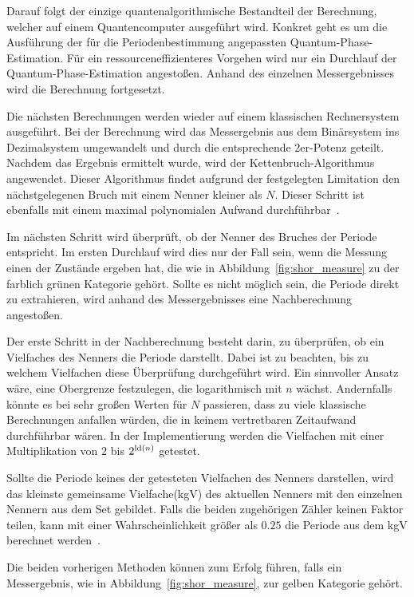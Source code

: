 Darauf folgt der einzige quantenalgorithmische Bestandteil der Berechnung, 
welcher auf einem Quantencomputer ausgeführt wird.
Konkret geht es um die Ausführung der für die Periodenbestimmung angepassten Quantum-Phase-Estimation. 
Für ein ressourceneffizienteres Vorgehen wird nur ein Durchlauf der Quantum-Phase-Estimation angestoßen.
Anhand des einzelnen Messergebnisses wird die Berechnung fortgesetzt.

Die nächsten Berechnungen werden wieder auf einem klassischen Rechnersystem ausgeführt.
Bei der Berechnung wird das Messergebnis aus dem Binärsystem ins Dezimalsystem umgewandelt
und durch die entsprechende 2er-Potenz geteilt.
Nachdem das Ergebnis ermittelt wurde, 
wird der Kettenbruch-Algorithmus angewendet. 
Dieser Algorithmus findet aufgrund der festgelegten Limitation den nächstgelegenen Bruch mit einem Nenner kleiner als \(N\).
Dieser Schritt ist ebenfalls mit einem maximal polynomialen Aufwand durchführbar~\autocite[230]{nielsen_chuang_2010}.

Im nächsten Schritt wird überprüft, ob der Nenner des Bruches der Periode entspricht.
Im ersten Durchlauf wird dies nur der Fall sein, 
wenn die Messung einen der Zustände ergeben hat, 
die wie in Abbildung~\ref{fig:shor_measure} zu der farblich grünen Kategorie gehört.
Sollte es nicht möglich sein, die Periode direkt zu extrahieren, 
wird anhand des Messergebnisses eine Nachberechnung angestoßen.

Der erste Schritt in der Nachberechnung besteht darin, 
zu überprüfen, ob ein Vielfaches des Nenners die Periode darstellt.
Dabei ist zu beachten, bis zu welchem Vielfachen diese Überprüfung durchgeführt wird. 
Ein sinnvoller Ansatz wäre, eine Obergrenze festzulegen, die logarithmisch mit \(n\) wächst.
Andernfalls könnte es bei sehr großen Werten für \(N\) passieren, 
dass zu viele klassische Berechnungen anfallen würden, die in keinem vertretbaren Zeitaufwand durchführbar wären.
In der Implementierung werden die Vielfachen mit einer Multiplikation von \(2\) bis \(2^{\operatorname{ld}(n)}\) getestet.

Sollte die Periode keines der getesteten Vielfachen des Nenners darstellen, 
wird das kleinste gemeinsame Vielfache(kgV) des aktuellen Nenners mit den einzelnen Nennern aus dem Set gebildet.
Falls die beiden zugehörigen Zähler keinen Faktor teilen, 
kann mit einer Wahrscheinlichkeit größer als \(0.25\) die Periode aus dem kgV berechnet werden~\cite[231]{nielsen_chuang_2010}.

Die beiden vorherigen Methoden können zum Erfolg führen, 
falls ein Messergebnis, wie in Abbildung~\ref{fig:shor_measure}, 
zur gelben Kategorie gehört. 

